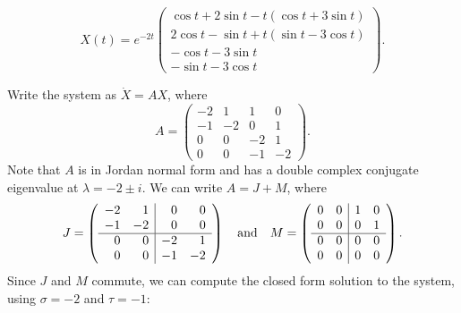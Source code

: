 \ans
\[
X(t) = e^{-2t}
\left(\begin{array}{c}
\cos t + 2\sin t - t(\cos t + 3\sin t) \\
2\cos t - \sin t + t(\sin t - 3\cos t) \\
-\cos t - 3\sin t \\
-\sin t - 3\cos t
\end{array}\right).
\]

\soln Write the system as $\dot{X} = AX$, where
\[
A =
\left(\begin{array}{rrrr}
-2 & 1 & 1 & 0 \\
-1 & -2 & 0 & 1 \\
0 & 0 & -2 & 1 \\
0 & 0 & -1 & -2
\end{array}\right).
\]
Note that $A$ is in Jordan normal form and has a double complex conjugate
eigenvalue at $\lambda = -2 \pm i$.  We can write $A = J + M$, where
\[
J = 
\left(\begin{array}{rr|rr}
-2 & 1 & 0 & 0 \\
-1 & -2 & 0 & 0 \\
\hline
0 & 0 & -2 & 1 \\
0 & 0 & -1 & -2
\end{array}\right) \quad\mbox{and}\quad
M =
\left(\begin{array}{rr|rr}
0 & 0 & 1 & 0 \\
0 & 0 & 0 & 1 \\
\hline
0 & 0 & 0 & 0 \\
0 & 0 & 0 & 0
\end{array}\right).
\]
Since $J$ and $M$ commute, we can compute the closed form solution to the
system, using $\sigma = -2$ and $\tau = -1$:
